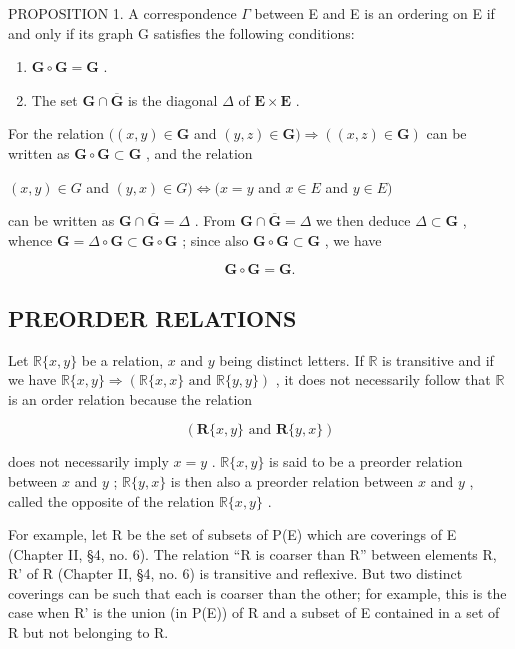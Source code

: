 PROPOSITION 1. A correspondence \(\Gamma\) between E and E is an ordering on E if and only if its graph G satisfies the following conditions:

\begin{enumerate}
\def\labelenumi{(\alph{enumi})}
\item
  \(\mathbf{G} \circ \mathbf{G} = \mathbf{G}\) .
\item
  The set \(\mathbf{G} \cap \overline{\mathbf{G}}\) is the diagonal \(\Delta\) of \(\mathbf{E} \times \mathbf{E}\) .
\end{enumerate}

For the relation \(((x, y) \in \mathbf{G}\) and \((y, z) \in \mathbf{G}) \Longrightarrow ((x, z) \in \mathbf{G})\) can be written as \(\mathbf{G} \circ \mathbf{G} \subset \mathbf{G}\) , and the relation

\((x, y) \in G\) and \((y, x) \in G) \iff (x = y\) and \(x \in E\) and \(y \in E)\)

can be written as \(\mathbf{G} \cap \overline{\mathbf{G}} = \Delta\) . From \(\mathbf{G} \cap \overline{\mathbf{G}} = \Delta\) we then deduce \(\Delta \subset \mathbf{G}\) , whence \(\mathbf{G} = \Delta \circ \mathbf{G} \subset \mathbf{G} \circ \mathbf{G}\) ; since also \(\mathbf{G} \circ \mathbf{G} \subset \mathbf{G}\) , we have

\[
\mathbf {G} \circ \mathbf {G} = \mathbf {G}.
\]

\subsection{PREORDER RELATIONS}

Let \(\mathbb{R}\{x, y\}\) be a relation, \(x\) and \(y\) being distinct letters. If \(\mathbb{R}\) is transitive and if we have \(\mathbb{R}\{x, y\} \Longrightarrow (\mathbb{R}\{x, x\} \text{ and } \mathbb{R}\{y, y\})\) , it does not necessarily follow that \(\mathbb{R}\) is an order relation because the relation

\[
(\mathbf {R} \{x, y \} \text { and } \mathbf {R} \{y, x \})
\]

does not necessarily imply \(x = y\) . \(\mathbb{R}\{x, y\}\) is said to be a preorder relation between \(x\) and \(y\) ; \(\mathbb{R}\{y, x\}\) is then also a preorder relation between \(x\) and \(y\) , called the opposite of the relation \(\mathbb{R}\{x, y\}\) .

For example, let R be the set of subsets of P(E) which are coverings of E (Chapter II, §4, no. 6). The relation ``R is coarser than R'' between elements R, R' of R (Chapter II, §4, no. 6) is transitive and reflexive. But two distinct coverings can be such that each is coarser than the other; for example, this is the case when R' is the union (in P(E)) of R and a subset of E contained in a set of R but not belonging to R.

